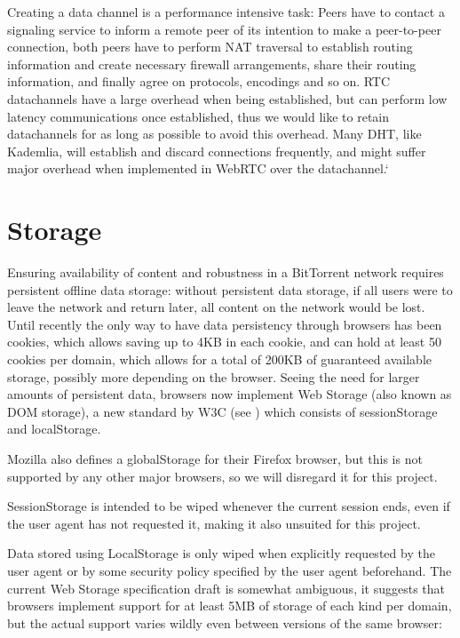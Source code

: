 Creating a data channel is a performance intensive task:
Peers have to contact a signaling service to inform a remote peer of its intention
to make a peer-to-peer connection, both peers have to perform NAT traversal to establish routing information 
and create necessary firewall arrangements, share their routing information,
and finally agree on protocols, encodings and so on.
RTC datachannels have a large overhead when being established,
but can perform low latency communications once established, 
thus we would like to retain datachannels for as long as possible to avoid this overhead.
Many \acs{DHT}, like Kademlia, will establish and discard connections frequently,
and might suffer major overhead when implemented in WebRTC over the datachannel.`

\section{Storage}
Ensuring availability of content and robustness in a BitTorrent network requires persistent offline data storage:
without persistent data storage, if all users were to leave the network and return later, all content on the 
network would be lost.
\newline\newline
Until recently the only way to have data persistency through browsers has been cookies, 
which allows saving up to 4KB in each cookie, and can hold at least 50 cookies per domain, 
which allows for a total of 200KB of guaranteed available storage, possibly more depending on the browser.
\newline\newline
Seeing the need for larger amounts of persistent data, browsers now implement Web Storage 
(also known as DOM storage), a new standard by W3C (see \citep{WebStorage})
which consists of sessionStorage and localStorage.

Mozilla also defines a globalStorage for their Firefox browser, 
but this is not supported by any other major browsers, so we will disregard it for this project.

SessionStorage is intended to be wiped whenever the current session ends, 
even if the user agent has not requested it, making it also unsuited for this project.

Data stored using LocalStorage is only wiped when explicitly requested by the user agent or 
by some security policy specified by the user agent beforehand.
\newline\newline
The current Web Storage specification draft is somewhat ambiguous, 
it suggests that browsers implement support for at least 5MB of storage of each kind per domain,
but the actual support varies wildly even between versions of the same browser:

